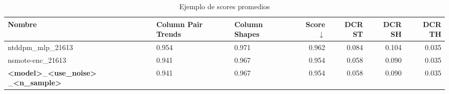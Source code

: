 \begin{table}[H]
    \centering
    \caption{Ejemplo de scores promedios}
    \label{tabla-show-score}
    \begin{tabular}{|m{10em}|m{5em}|m{5em}|r|r|r|r|}
        \hline
        \rowcolor[gray]{0.8}
        Nombre & Column Pair Trends & Column Shapes & \textbf{Score} $\downarrow$ & DCR ST& DCR SH& DCR TH\\ \hline
        ntddpm\_mlp\_21613 & 0.954 & 0.971 & 0.962 & 0.084 & 0.104 & 0.035 \\ \hline
        nsmote-enc\_21613 & 0.941 & 0.967 & 0.954 & 0.058 & 0.090 & 0.035 \\ \hline
        \textbf{<model>}\_\textbf{<use\_noise>} \_\textbf{<n\_sample>} & 0.941 & 0.967 & 0.954 & 0.058 & 0.090 & 0.035 \\ \hline
    \end{tabular}
\end{table}


